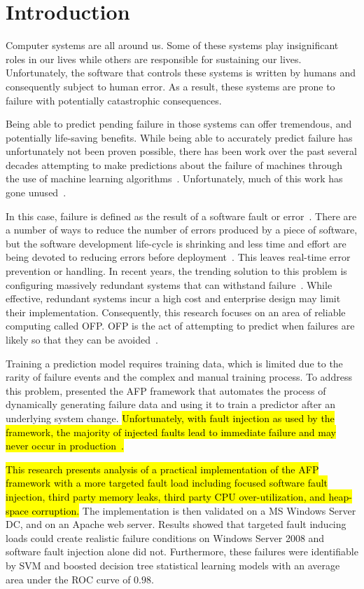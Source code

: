 \section{Introduction} \label{chapter1}
Computer systems are all around us.  Some of these systems play insignificant
roles in our lives while others are responsible for sustaining our lives.
Unfortunately, the software that controls these systems is written by humans
and consequently subject to human error.  As a result, these systems are prone
to failure with potentially catastrophic consequences.  

Being able to predict pending failure in those systems can offer tremendous,
and potentially life-saving benefits.  While being able to accurately predict
failure has unfortunately not been proven possible, there has been work over
the past several decades attempting to make predictions about the failure of
machines through the use of machine learning algorithms~\citep{salfnerSurvey}.
Unfortunately, much of this work has gone unused~\citep{irrera2015}.  

In this case, failure is defined as the result of a software fault or
error~\citep{salfnerSurvey}.  There are a number of ways to reduce the number
of errors produced by a piece of software, but the software development
life-cycle is shrinking and less time and effort are being devoted to reducing
errors before deployment~\citep{schmidt2016}.  This leaves real-time error
prevention or handling.  In recent years, the trending solution to this problem
is configuring massively redundant systems that can withstand
failure~\citep{bauer2012}.  While effective, redundant systems incur a high
cost and enterprise design may limit their implementation.  Consequently, this
research focuses on an area of reliable computing called \ac{OFP}.  \ac{OFP} is
the act of attempting to predict when failures are likely so that they can be
avoided~\citep{salfnerSurvey}.  

Training a prediction model requires training data, which is limited due to the
rarity of failure events and the complex and manual training process.  To
address this problem, \citet{irrera2015} presented the \ac{AFP} framework that
automates the process of dynamically generating failure data and using it to
train a predictor after an underlying system change.  \hl{Unfortunately, with
fault injection as used by the framework, the majority of injected faults lead
to immediate failure and may never occur in production~\citep{kikuchi2014}.}

\hl{This research presents analysis of a practical implementation of the
\ac{AFP} framework with a more targeted fault load including focused software
fault injection, third party memory leaks, third party \ac{CPU}
over-utilization, and heap-space corruption.} The implementation is then
validated on a \ac{MS} Windows Server \ac{DC}, and on an Apache web server.
Results showed that targeted fault inducing loads could create realistic
failure conditions on Windows Server 2008 and software fault injection alone
did not.  Furthermore, these failures were identifiable by \ac{SVM} and boosted
decision tree statistical learning models with an average area under the
\ac{ROC} curve of $0.98$.

